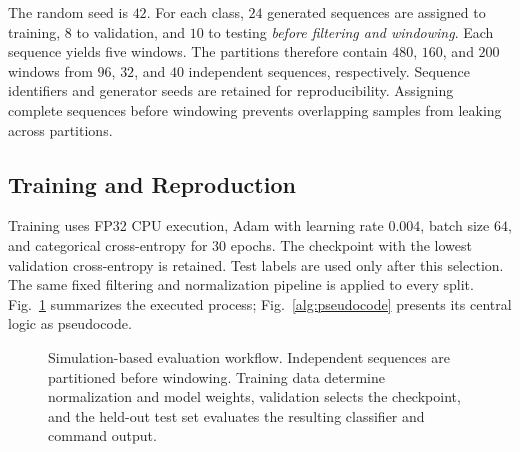 \documentclass[conference]{IEEEtran}
\begin{document}
The random seed is $42$. For each class, $24$ generated sequences are assigned to training, $8$ to validation, and $10$ to testing \emph{before filtering and windowing}. Each sequence yields five windows. The partitions therefore contain $480$, $160$, and $200$ windows from $96$, $32$, and $40$ independent sequences, respectively. Sequence identifiers and generator seeds are retained for reproducibility. Assigning complete sequences before windowing prevents overlapping samples from leaking across partitions.

\subsection{Training and Reproduction}
Training uses FP32 CPU execution, Adam with learning rate $0.004$, batch size $64$, and categorical cross-entropy for $30$ epochs. The checkpoint with the lowest validation cross-entropy is retained. Test labels are used only after this selection. The same fixed filtering and normalization pipeline is applied to every split. Fig.~\ref{fig:workflow} summarizes the executed process; Fig.~\ref{alg:pseudocode} presents its central logic as pseudocode.

\begin{figure}[t]\centering

\caption{Simulation-based evaluation workflow. Independent sequences are partitioned before windowing. Training data determine normalization and model weights, validation selects the checkpoint, and the held-out test set evaluates the resulting classifier and command output.}
\label{fig:workflow}
\end{figure}
\end{document}
